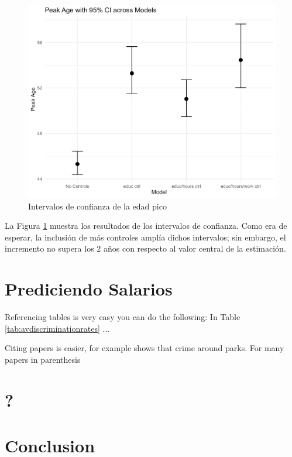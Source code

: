 \documentclass[12pt,a4paper,onecolumn]{article}
\begin{document}
\begin{figure}[H]
\caption{Intervalos de confianza de la edad pico} \label{fig:age_whiskey_bar}
    \includegraphics[scale=0.75]{../views/age_whiskey_point.png}   
 \flushleft
\end{figure}

La Figura \ref{fig:age_whiskey_bar} muestra los resultados de los intervalos de confianza. Como era de esperar, la inclusión de más controles amplía dichos intervalos; sin embargo, el incremento no supera los 2 años con respecto al valor central de la estimación.
\section{Prediciendo Salarios}

Referencing tables is very easy you can do the following: In Table \ref{tab:avdiscriminationrates} ...

Citing papers is easier, for example \cite{albouy2020unlocking} shows that crime around parks. For many papers in parenthesis \cite{albouy2020unlocking,mcmillen2019more} 

\section{?}

\section{Conclusion}






\pagebreak
\singlespacing

\pagebreak
\end{document}
